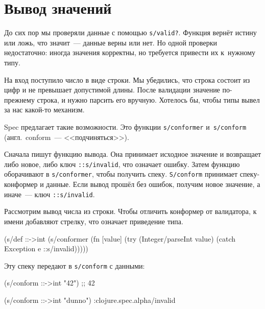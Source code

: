 \section{Вывод значений}

\label{spec-conform}


До сих пор мы проверяли данные с помощью \verb|s/valid?|. Функция вернёт
истину или ложь, что значит~--- данные верны или нет. Но одной проверки
недостаточно: иногда значения корректны, но требуется привести их к~нужному
типу.

На вход поступило число в виде строки. Мы убедились, что строка состоит из цифр
и не превышает допустимой длины. После валидации значение по-прежнему строка, и
нужно парсить его вручную. Хотелось бы, чтобы типы вывел за нас какой-то
механизм.


\mnoindent
Spec предлагает такие возможности. Это функции \verb|s/conformer|
и~\verb|s/conform| (англ.~conform~--- <<подчиняться>>).

\label{spec-invalid}



Сначала пишут функцию вывода. Она принимает исходное значение и возвращает либо
новое, либо ключ \verb|::s/invalid|, что означает ошибку. Затем функцию
оборачивают в \verb|s/conformer|, чтобы получить спеку. \verb|S/conform|
принимает спеку-конформер и данные. Если вывод прошёл без ошибок, получим новое
значение, а иначе~--- ключ \verb|::s/invalid|.

Рассмотрим вывод числа из строки. Чтобы отличить конформер от валидатора, к
имени добавляют стрелку, что означает приведение типа.

\begin{english}
  \begin{clojure}
(s/def ::->int
  (s/conformer
   (fn [value]
     (try
       (Integer/parseInt value)
       (catch Exception e
         ::s/invalid)))))
  \end{clojure}
\end{english}

\noindent
Эту спеку передают в \verb|s/conform| с данными:

\begin{english}
  \begin{clojure}
(s/conform ::->int "42") ;; 42

(s/conform ::->int "dunno")
:clojure.spec.alpha/invalid
  \end{clojure}
\end{english}

